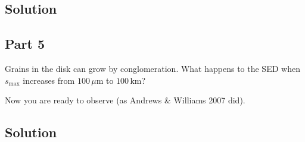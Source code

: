 \documentclass[12pt]{article}
\begin{document}
\subsection*{Solution}




\subsection*{Part 5}

Grains in the disk can grow by conglomeration. What happens to the SED when $s_\mathrm{max}$ increases from $100\,\mu\mathrm{m}$ to $100\,\mathrm{km}$?

Now you are ready to observe (as Andrews \& Williams 2007 did).


\subsection*{Solution}
\end{document}
